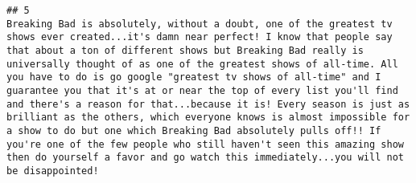 \documentclass[
]{article}
\begin{document}
\begin{verbatim}
## 5                                                                                                                                                                                                                                                                                                                                                                                                                                                                                                                                                                                                                                                                                                                                                                                                                                                                                                                                                                                                                                                                                                                                                                                                                                                                                                                                                                                                                   Breaking Bad is absolutely, without a doubt, one of the greatest tv shows ever created...it's damn near perfect! I know that people say that about a ton of different shows but Breaking Bad really is universally thought of as one of the greatest shows of all-time. All you have to do is go google "greatest tv shows of all-time" and I guarantee you that it's at or near the top of every list you'll find and there's a reason for that...because it is! Every season is just as brilliant as the others, which everyone knows is almost impossible for a show to do but one which Breaking Bad absolutely pulls off!! If you're one of the few people who still haven't seen this amazing show then do yourself a favor and go watch this immediately...you will not be disappointed!

\end{verbatim}
\end{document}
